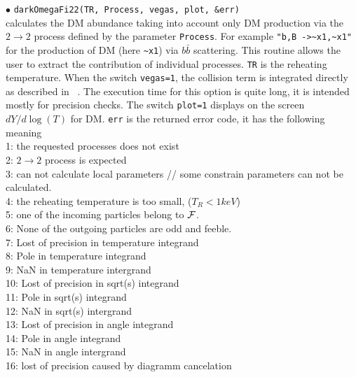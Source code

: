 \documentclass[12pt,a4paper]{article}
\begin{document}
\noindent
$\bullet$ \verb|darkOmegaFi22(TR, Process, vegas, plot, &err)|  \\
calculates the  DM abundance taking into account only DM production via the  $2\to2$ process defined by the parameter {\tt Process}. For example \verb|"b,B ->~x1,~x1"|  for the production of DM (here \verb|~x1|) via $b\bar{b}$ scattering. This routine allows the user to extract the contribution of individual processes. \verb|TR| is the  reheating temperature. When  the switch \verb|vegas=1|, the collision term is integrated directly as described in ~\cite{Belanger:2018ccd}. The execution time for this option is quite long,  it is  intended mostly for precision checks. The switch \verb|plot=1| displays on the screen  $dY/d\log(T)$ for DM. 
{\tt err} is the  returned error code, it has the following meaning\\
1: the requested processes does not exist\\
2: $2\rightarrow 2$ process is expected\\
3: can not calculate local parameters  // some constrain parameters can not be calculated.\\
4: the reheating temperature is too small, ($T_R<1 keV$)\\
5: one of the incoming particles belong to ${\cal F}$.\\
6: None of the outgoing particles are odd  and feeble.\\
 7: Lost of precision in  temperature integrand\\
 8: Pole in temperature integrand\\
 9: NaN in temperature intergrand\\
10: Lost of precision in  sqrt(s) integrand\\
11: Pole in sqrt(s) integrand\\
12: NaN  in sqrt(s) intergrand\\
13: Lost of precision in angle integrand\\
14: Pole in angle  integrand\\
15: NaN  in angle  intergrand\\
16: lost of precision caused by diagramm cancelation\\
\end{document}
